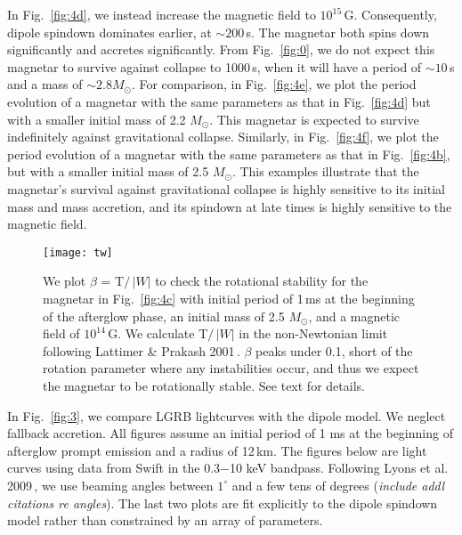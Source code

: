 \documentclass{article}
\begin{document}
In Fig.~\ref{fig:4d}, we instead increase the magnetic field to $10^{15}$\,G. Consequently, dipole spindown dominates earlier, at $\sim 200$\,s. The magnetar both spins down significantly and accretes significantly. From Fig.~\ref{fig:0}, we do not expect this magnetar to survive against collapse to 1000\,s, when it will have a period of $\sim 10$\,s and a mass of $\sim 2.8 M_{\odot}$. For comparison, in Fig.~\ref{fig:4e}, we plot the period evolution of a magnetar with the same parameters as that in Fig.~\ref{fig:4d} but with a smaller initial mass of 2.2 $M_{\odot}$. This magnetar is expected to survive indefinitely against gravitational collapse. Similarly, in Fig.~\ref{fig:4f}, we plot the period evolution of a magnetar with the same parameters as that in Fig.~\ref{fig:4b}, but with a smaller initial mass of 2.5 $M_{\odot}$. This examples illustrate that the magnetar's survival against gravitational collapse is highly sensitive to its initial mass and mass accretion, and its spindown at late times is highly sensitive to the magnetic field.

\begin{figure}[h!]
\centering
\texttt{[image: tw]}
\caption{We plot $\beta$ = T$/$\,$|W|$ to check the rotational stability for the magnetar in Fig.~\ref{fig:4c} with initial period of 1\,ms at the beginning of the afterglow phase, an initial mass of 2.5 $M_{\odot}$, and a magnetic field of $10^{14}$\,G. We calculate T$/$\,$|W|$ in the non-Newtonian limit following Lattimer \& Prakash 2001\,\cite{Lattimer:2001ap}. $\beta$ peaks under 0.1, short of the rotation parameter where any instabilities occur, and thus we expect the magnetar to be rotationally stable. See text for details.}
\label{fig:tw}
\end{figure}

In Fig.~\ref{fig:3}, we compare LGRB lightcurves with the dipole model. We neglect fallback accretion. All figures assume an initial period of 1 ms at the beginning of afterglow prompt emission and a radius of 12\,km. The figures below are light curves using data from Swift in the 0.3$-$10 keV bandpass. Following Lyons et al.\,2009\,\cite{Lyons:2009ka}, we use beaming angles between $1^{\circ}$ and a few tens of degrees \cite{Lyons:2009ka} (\textit{include addl citations re angles}).  The last two plots are fit explicitly to the dipole spindown model rather than constrained by an array of parameters.
\end{document}
